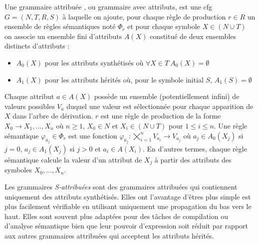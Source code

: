 \begin{definition}
    Une grammaire attribuée \cite{knuthSemanticsContextfreeLanguages1968}, ou grammaire avec attributs, est une \gls{cfg} $G = (N, T, R, S)$ à laquelle on ajoute, pour chaque règle de production $r \in R$ un ensemble de règles sémantiques noté $\Phi_r$ et pour chaque symbole $X \in (N \cup T)$ on associe un ensemble fini d'attributs $A(X)$ constitué de deux ensembles distincts d'attributs :
    \begin{itemize}
        \item $A_0(X)$ pour les attributs synthétisés où $\forall X \in T ~ A_0(X) = \emptyset$
        \item $A_1(X)$ pour les attributs hérités où, pour le symbole initial $S$, $A_1(S) = \emptyset$
    \end{itemize}
    Chaque attribut $a \in A(X)$ possède un ensemble (potentiellement infini) de valeurs possibles $V_a$ duquel une valeur est sélectionnée pour chaque apparition de $X$ dans l'arbre de dérivation.
    $r$ est une règle de production de la forme $X_0 \to X_1, \dots, X_n$ où $n \ge 1$, $X_0 \in N$ et $X_i \in (N \cup T)$ pour $1 \le i \le n$.
    Une règle sémantique $\varphi_{a_j} \in \Phi_r$ est une fonction $\varphi_{a_j} : \bigtimes_{i = 1}^n V_{a_i} \to V_{a_j}$ où $a_j \in A_0(X_j)$ si $j = 0$, $a_j \in A_1(X_j)$ si $j > 0$ et $a_i \in A(X_i)$.
    En d'autres termes, chaque règle sémantique calcule la valeur d'un attribut de $X_j$ à partir des attributs des symboles $X_0, \dots, X_n$.

    Les grammaires \emph{S-attribuées} sont des grammaires attribuées qui contiennent uniquement des attributs synthétisés.
    Elles ont l'avantage d'êtres plus simple est plus facilement vérifiable en utilisant uniquement une propagation du bas vers le haut.
    Elles sont souvent plus adaptées pour des tâches de compilation ou d'analyse sémantique bien que leur pouvoir d'expression soit réduit par rapport aux autres grammaires attribuées qui acceptent les attributs hérités.
\end{definition}

